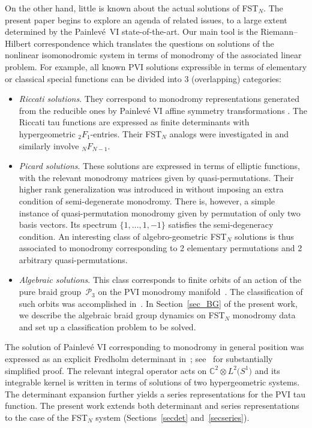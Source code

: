 \documentclass[pdftex]{sigma}
\numberwithin{equation}{section}
\begin{document}
On the other hand, little is known about the actual solutions of FST$_N$. The present paper begins to explore an agenda of related issues, to a large extent determined by the Painlev\'e~VI state-of-the-art. Our main tool is the Riemann--Hilbert correspondence which translates the questions on solutions of the nonlinear isomonodromic system in terms of monodromy of the associated linear problem. For example, all known PVI solutions expressible in terms of elementary or classical special functions can be divided into 3 (overlapping) categories:
\begin{itemize}\itemsep=0pt
\item \textit{Riccati solutions}. They correspond to monodromy representations generated from the reducible ones by Painlev\'e VI affine symmetry transformations \cite{Okamoto1}. The Riccati tau functions are expressed as finite determinants with hypergeometric $_2F_1$-entries. Their FST$_N$ analogs were investigated in \cite{ManoTsuda, Suzuki2,Tsuda2} and similarly involve $_NF_{N-1}$.
\item \textit{Picard solutions}. These solutions \cite{DIKZ,KK,Mazzocco} are expressed in terms of elliptic functions, with the relevant monodromy matrices given by quasi-permutations. Their higher rank gene\-ra\-lization was introduced in \cite{Korotkin} without imposing an extra condition of semi-degenerate monodromy. There is, however, a simple instance of quasi-permutation monodromy given by permutation of only two basis vectors. Its spectrum $\{1,\ldots,1,-1\}$ satisfies the semi-degeneracy condition. An interesting class of algebro-geometric FST$_N$ solutions is thus associated to monodromy corresponding to 2 elementary permutations and 2 arbitrary quasi-permutations.
\item \textit{Algebraic solutions}. This class corresponds to finite orbits of an action of the pure braid group~$\mathcal P_3$ on the PVI monodromy manifold~\cite{DM}. The classification of such orbits was accomplished in~\cite{LT}. In Section~\ref{sec_BG} of the present work, we describe the algebraic braid group dynamics on FST$_N$ monodromy data and set up a classification problem to be solved.
\end{itemize}

The solution of Painlev\'e VI corresponding to monodromy in general position was expressed as an explicit Fredholm determinant in~\cite{GL16}; see~\cite{CGL} for substantially simplified proof. The relevant integral operator acts on $\mathbb C^2\otimes L^2\big(S^1\big)$ and its integrable kernel is written in terms of solutions of two hypergeometric systems. The determinant expansion further yields a series representations for the PVI tau function. The present work extends both determinant and series representations to the case of the FST$_N$ system (Sections~\ref{secdet} and~\ref{secseries}).
\end{document}
